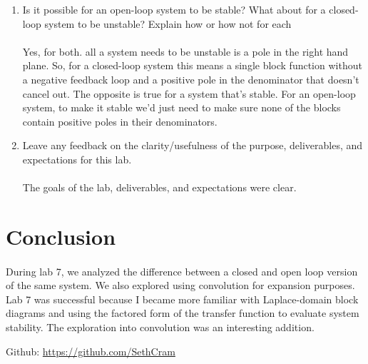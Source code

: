 \documentclass[12pt]{report}
\begin{document}
\begin{enumerate}
        \item Is it possible for an open-loop system to be stable? What about for a closed-loop system to be unstable? Explain how or how not for each
        \paragraph{} Yes, for both. all a system needs to be unstable is a pole in the right hand plane. So, for a closed-loop system this means a single block function without a negative feedback loop and a positive pole in the denominator that doesn't cancel out. The opposite is true for a system that's stable. For an open-loop system, to make it stable we'd just need to make sure none of the blocks contain positive poles in their denominators.    
                
        \item Leave any feedback on the clarity/usefulness of the purpose, deliverables, and expectations for this lab.
        \paragraph{} The goals of the lab, deliverables, and expectations were clear. 
    \end{enumerate}

\section{Conclusion}


    \paragraph{} During lab 7, we analyzed the difference between a closed and open loop version of the same system. We also explored using convolution for expansion purposes. Lab 7 was successful because I became more familiar with Laplace-domain block diagrams and using the factored form of the transfer function to evaluate system stability. The exploration into convolution was an interesting addition.  
    
    Github: \url{https://github.com/SethCram} 
\end{document}

